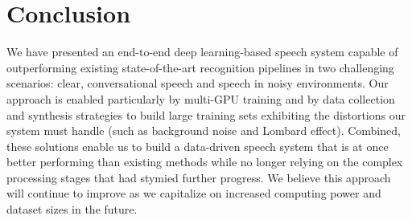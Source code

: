 \section{Conclusion}

We have presented an end-to-end deep learning-based speech system capable of
outperforming existing state-of-the-art recognition pipelines in two
challenging scenarios: clear, conversational speech and speech in noisy
environments. Our approach is enabled particularly by multi-GPU training and by
data collection and synthesis strategies to build large training sets
exhibiting the distortions our system must handle (such as background noise and
Lombard effect). Combined, these solutions enable us to build a data-driven
speech system that is at once better performing than existing methods while no
longer relying on the complex processing stages that had stymied further
progress. We believe this approach will continue to improve as we capitalize on
increased computing power and dataset sizes in the future.
